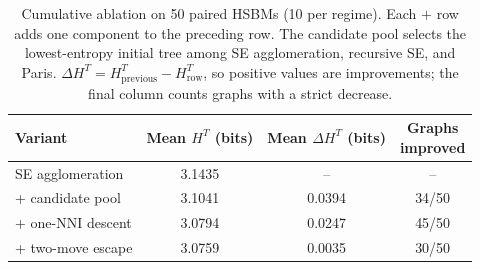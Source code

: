 \begin{table}[H]
\centering\small
\caption{Cumulative \NEST ablation on 50 paired HSBMs (10 per regime). Each $+$ row adds one
component to the preceding row. The candidate pool selects the lowest-entropy
initial tree among SE agglomeration, recursive SE, and Paris.
$\Delta H^T=H^T_{\mathrm{previous}}-H^T_{\mathrm{row}}$, so positive values are
improvements; the final column counts graphs with a strict decrease.}
\label{tab:ablation}
\begin{tabular*}{0.88\textwidth}{@{\extracolsep{\fill}}lccc@{}}
\toprule
Variant
& \shortstack{Mean $H^T$\\(bits)}
& \shortstack{Mean $\Delta H^T$\\(bits)}
& \shortstack{Graphs\\improved} \\
\midrule
SE agglomeration & 3.1435 & -- & -- \\
+ candidate pool & 3.1041 & 0.0394 & 34/50 \\
+ one-NNI descent & 3.0794 & 0.0247 & 45/50 \\
+ two-move escape & 3.0759 & 0.0035 & 30/50 \\
\bottomrule
\end{tabular*}
\end{table}
